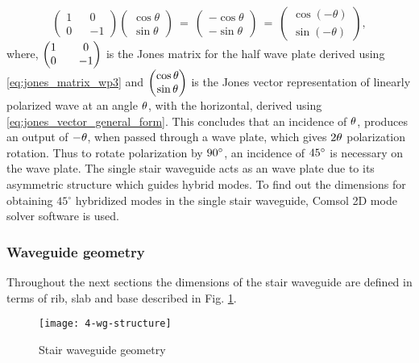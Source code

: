 \documentclass[../report.tex]{subfiles}
\begin{document}
\begin{equation}\label{eq:wave_plate_pr}
\left( \begin{matrix} 1& & 0\\ 0& & -1\end{matrix} \right) \left( \begin{matrix} \cos \theta \\ \sin \theta \end{matrix} \right) ~ = ~ \left( \begin{matrix} -\cos \theta \\ -\sin \theta \end{matrix}\right) ~ = ~ \left( \begin{matrix} \cos \left(-\theta\right) \\ \sin \left(-\theta\right) \end{matrix} \right), 
\end{equation}
where, $\mathrm{\left( \begin{matrix} 1& & 0\\ 0& & -1\end{matrix} \right)}$ is the Jones matrix for the half wave plate derived using \ref{eq:jones_matrix_wp3} and $\mathrm{\left( \begin{matrix} \cos \theta \\ \sin \theta \end{matrix} \right)}$ is the Jones vector representation of linearly polarized wave at an angle $\mathrm{\theta}$, with the horizontal, derived using \ref{eq:jones_vector_general_form}. This concludes that an incidence of $\mathrm{\theta}$, produces an output of $\mathrm{-\theta}$, when passed through a wave plate, which gives $\mathrm{2\theta}$ polarization rotation. Thus to rotate polarization by $\mathrm{90{^\circ}}$, an incidence of $\mathrm{45{^\circ}}$ is necessary on the wave plate. The single stair waveguide acts as an wave plate due to its asymmetric structure which guides hybrid modes. To find out the dimensions for obtaining $45{^\circ}$ hybridized modes in the single stair waveguide, Comsol 2D mode solver software is used. 

\subsubsection{Waveguide geometry}
Throughout the next sections the dimensions of the stair waveguide are defined in terms of rib, slab and base described in Fig. \ref{fig:4_wg_structure}.   

\begin{figure}[H] %
	\centering
	\texttt{[image: 4-wg-structure]}
	\caption{Stair waveguide geometry}
	\label{fig:4_wg_structure}
\end{figure}
\end{document}
